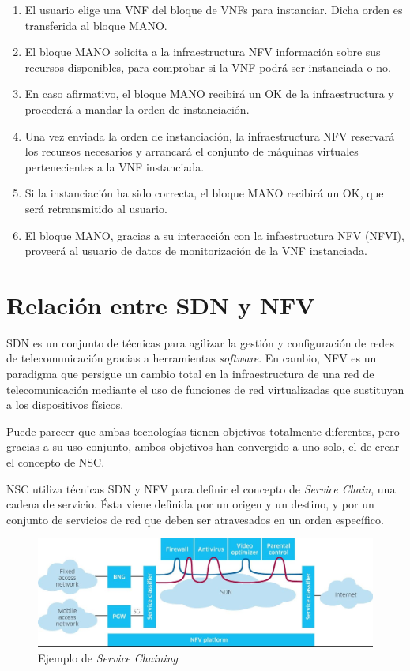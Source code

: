 \begin{enumerate}
	\item El usuario elige una \ac{VNF} del bloque de \acp{VNF} para instanciar. Dicha orden es transferida al bloque \ac{MANO}.
	\item El bloque \ac{MANO} solicita a la infraestructura \ac{NFV} información sobre sus recursos disponibles, para comprobar si la \ac{VNF} podrá ser instanciada o no.
	\item En caso afirmativo, el bloque MANO recibirá un OK de la infraestructura y procederá a mandar la orden de instanciación.
	\item Una vez enviada la orden de instanciación, la infraestructura \ac{NFV} reservará los recursos necesarios y arrancará el conjunto de máquinas virtuales pertenecientes a la \ac{VNF} instanciada.
	\item Si la instanciación ha sido correcta, el bloque MANO recibirá un OK, que será retransmitido al usuario.
	\item El bloque \ac{MANO}, gracias a su interacción con la infaestructura \ac{NFV} (\ac{NFVI}), proveerá al usuario de datos de monitorización de la \ac{VNF} instanciada.
\end{enumerate}

\section{Relación entre SDN y NFV}
\label{sec:sdnnfv}

\ac{SDN} es un conjunto de técnicas para agilizar la gestión y configuración de redes de telecomunicación gracias a herramientas \textit{software}. En cambio, \ac{NFV} es un paradigma que persigue un cambio total en la infraestructura de una red de telecomunicación mediante el uso de funciones de red virtualizadas que sustituyan a los dispositivos físicos.

Puede parecer que ambas tecnologías tienen objetivos totalmente diferentes, pero gracias a su uso conjunto, ambos objetivos han convergido a uno solo, el de crear el concepto de \ac{NSC}.

\ac{NSC} utiliza técnicas \ac{SDN} y \ac{NFV} para definir el concepto de \textit{Service Chain}, una cadena de servicio. Ésta viene definida por un origen y un destino, y por un conjunto de servicios de red que deben ser atravesados en un orden específico.

\begin{figure}[!ht]
	\centering
	\includegraphics[width=0.8\linewidth]{imagenes/servicechaining}
	\caption{Ejemplo de \textit{Service Chaining}}
	\label{fig:servicechaining}
\end{figure}

